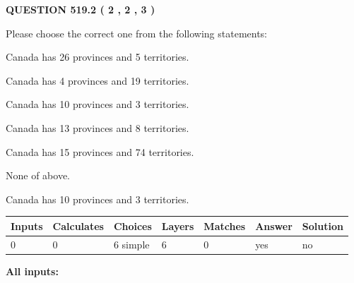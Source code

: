 \documentclass[12pt]{article}
\begin{document}
   
  
\vspace{0.2in}
  
{\textbf{\Large{QUESTION
519.2 
 ( 2 , 2 , 3 )
}}}
  
  
Please choose the correct one from the following statements:
 
 
Canada has  26 provinces and  5 territories.
 
 
Canada has   4 provinces and  19 territories.
 
 
Canada has 10  provinces and 3 territories.
 
 
Canada has  13 provinces and  8 territories.
 
 
Canada has  15 provinces and  74 territories.
 
 
 None of above.
 
 
\noindent{}
 
 
Canada has 10  provinces and 3 territories.
 
 
\noindent{}
 
 
   
   
   
   
\noindent\begin{tabular}{|l|l|l|l|l|l|l|}
 \hline
Inputs & Calculates & Choices & Layers & Matches & Answer & Solution \\ \hline
 0  & 
 0  & 
 6
  simple  
  & 
 6  & 
 0  & 
  yes & 
  no 
  \\ \hline
 \end{tabular}
   
   
   
   
\noindent{}
   
   
   
   
\noindent\vspace{0.1in}\hspace{-0.08in} {\textbf{\Large{All inputs: }}}
   
   
   
   
   
   
 \vspace{0.2in}
 
\end{document}
